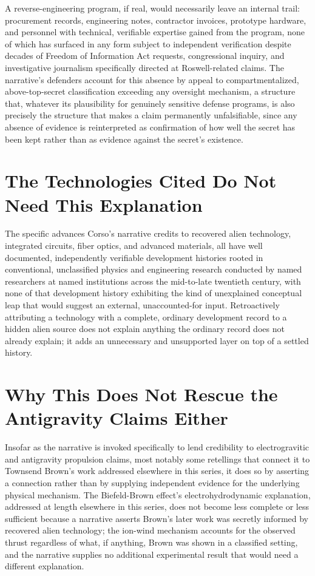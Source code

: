 \documentclass[11pt]{article}
\begin{document}
A reverse-engineering program, if real, would necessarily leave an internal trail: procurement records, engineering notes, contractor invoices, prototype hardware, and personnel with technical, verifiable expertise gained from the program, none of which has surfaced in any form subject to independent verification despite decades of Freedom of Information Act requests, congressional inquiry, and investigative journalism specifically directed at Roswell-related claims. The narrative's defenders account for this absence by appeal to compartmentalized, above-top-secret classification exceeding any oversight mechanism, a structure that, whatever its plausibility for genuinely sensitive defense programs, is also precisely the structure that makes a claim permanently unfalsifiable, since any absence of evidence is reinterpreted as confirmation of how well the secret has been kept rather than as evidence against the secret's existence.

\section{The Technologies Cited Do Not Need This Explanation}

The specific advances Corso's narrative credits to recovered alien technology, integrated circuits, fiber optics, and advanced materials, all have well documented, independently verifiable development histories rooted in conventional, unclassified physics and engineering research conducted by named researchers at named institutions across the mid-to-late twentieth century, with none of that development history exhibiting the kind of unexplained conceptual leap that would suggest an external, unaccounted-for input. Retroactively attributing a technology with a complete, ordinary development record to a hidden alien source does not explain anything the ordinary record does not already explain; it adds an unnecessary and unsupported layer on top of a settled history.

\section{Why This Does Not Rescue the Antigravity Claims Either}

Insofar as the narrative is invoked specifically to lend credibility to electrogravitic and antigravity propulsion claims, most notably some retellings that connect it to Townsend Brown's work addressed elsewhere in this series, it does so by asserting a connection rather than by supplying independent evidence for the underlying physical mechanism. The Biefeld-Brown effect's electrohydrodynamic explanation, addressed at length elsewhere in this series, does not become less complete or less sufficient because a narrative asserts Brown's later work was secretly informed by recovered alien technology; the ion-wind mechanism accounts for the observed thrust regardless of what, if anything, Brown was shown in a classified setting, and the narrative supplies no additional experimental result that would need a different explanation.
\end{document}
